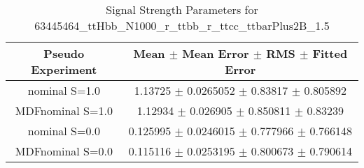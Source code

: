 \begin{table}
\centering
\caption{Signal Strength Parameters for 63445464\_ttHbb\_N1000\_r\_ttbb\_r\_ttcc\_ttbarPlus2B\_1.5}
\begin{tabular}{cc}
\toprule
Pseudo Experiment & Mean $\pm$ Mean Error $\pm$ RMS $\pm$ Fitted Error\\
\midrule
nominal S=1.0 & \num{1.13725} $\pm$ \num{0.0265052} $\pm$ \num{0.83817} $\pm$ \num{0.805892}\\
MDFnominal S=1.0 & \num{1.12934} $\pm$ \num{0.026905} $\pm$ \num{0.850811} $\pm$ \num{0.83239}\\
nominal S=0.0 & \num{0.125995} $\pm$ \num{0.0246015} $\pm$ \num{0.777966} $\pm$ \num{0.766148}\\
MDFnominal S=0.0 & \num{0.115116} $\pm$ \num{0.0253195} $\pm$ \num{0.800673} $\pm$ \num{0.790614}\\
\bottomrule
\end{tabular}
\end{table}